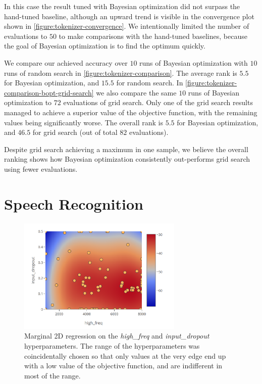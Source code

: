 In this case the result tuned with Bayesian optimization did not surpass the hand-tuned baseline, although an upward trend is visible in the convergence plot shown in \autoref{figure:tokenizer-convergence}. We intentionally limited the number of evaluations to $50$ to make comparisons with the hand-tuned baselines, because the goal of Bayesian optimization is to find the optimum quickly.

We compare our achieved accuracy over $10$ runs of Bayesian optimization with $10$ runs of random search in \autoref{figure:tokenizer-comparison}. The average rank is $5.5$ for Bayesian optimization, and $15.5$ for random search. In \autoref{figure:tokenizer-comparison-bopt-grid-search} we also compare the same $10$ runs of Bayesian optimization to $72$ evaluations of grid search. Only one of the grid search results managed to achieve a superior value of the objective function, with the remaining values being significantly worse. The overall rank is $5.5$ for Bayesian optimization, and $46.5$ for grid search (out of total $82$ evaluations).

Despite grid search achieving a maximum in one sample, we believe the overall ranking shows how Bayesian optimization consistently out-performs grid search using fewer evaluations.

\section{Speech Recognition}

\begin{figure}
	\begin{center}
		\includegraphics[width=0.7\textwidth]{images/speech-2d-almost-insensitive.png}
		\caption{Marginal 2D regression on the \emph{high\_freq} and \emph{input\_dropout} hyperparameters. The range of the hyperparameters was coincidentally chosen so that only values at the very edge end up with a low value of the objective function, and are indifferent in most of the range.}
		\label{figure:2d-almost-insensitive}
	\end{center}
\end{figure}

